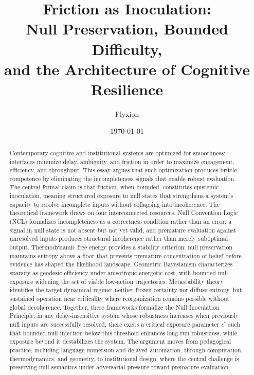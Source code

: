 \documentclass[11pt]{article}
\title{\textbf{Friction as Inoculation:\\[4pt]
Null Preservation, Bounded Difficulty,\\[2pt]
and the Architecture of Cognitive Resilience}}
\author{Flyxion}
\date{\today}
\theoremstyle{remark}
\begin{document}
\maketitle

\begin{abstract}
Contemporary cognitive and institutional systems are optimized for smoothness: interfaces minimize delay, ambiguity, and friction in order to maximize engagement, efficiency, and throughput. This essay argues that such optimization produces brittle competence by eliminating the incompleteness signals that enable robust evaluation. The central formal claim is that friction, when bounded, constitutes epistemic inoculation, meaning structured exposure to null states that strengthens a system's capacity to resolve incomplete inputs without collapsing into incoherence. The theoretical framework draws on four interconnected resources. Null Convention Logic (NCL) formalizes incompleteness as a correctness condition rather than an error: a signal in null state is not absent but not yet valid, and premature evaluation against unresolved inputs produces structural incoherence rather than merely suboptimal output. Thermodynamic free energy provides a stability criterion: null preservation maintains entropy above a floor that prevents premature concentration of belief before evidence has shaped the likelihood landscape. Geometric Bayesianism characterizes sparsity as geodesic efficiency under anisotropic energetic cost, with bounded null exposure widening the set of viable low-action trajectories. Metastability theory identifies the target dynamical regime: neither frozen certainty nor diffuse entropy, but sustained operation near criticality where reorganization remains possible without global decoherence. Together, these frameworks formalize the Null Inoculation Principle: in any delay-insensitive system whose robustness increases when previously null inputs are successfully resolved, there exists a critical exposure parameter $\epsilon^*$ such that bounded null injection below this threshold enhances long-run robustness, while exposure beyond it destabilizes the system. The argument moves from pedagogical practice, including language immersion and delayed automation, through computation, thermodynamics, and geometry, to institutional design, where the central challenge is preserving null semantics under adversarial pressure toward premature evaluation.
\end{abstract}

\tableofcontents
\newpage
\end{document}
